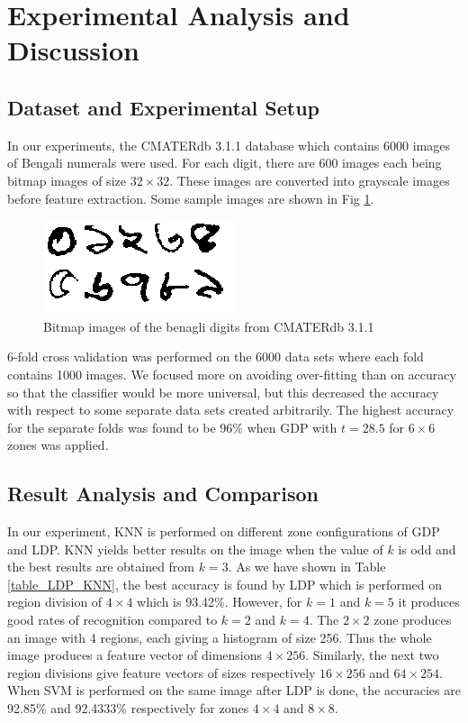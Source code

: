 \documentclass[conference]{IEEEtran}
\begin{document}
\section{Experimental Analysis and Discussion}

\subsection{Dataset and Experimental Setup}
In our experiments, the CMATERdb 3.1.1 \cite{2009cmater} database which contains 6000 images of Bengali numerals were used. For each digit, there are 600 images each being bitmap images of size $32 \times 32$. These images are converted into grayscale images before feature extraction. Some sample images are shown in Fig \ref{fig:bangladigits}.

\begin{figure}
	\includegraphics[width=\linewidth]{digits.png}
	\caption{Bitmap images of the benagli digits from CMATERdb 3.1.1}
	\label{fig:bangladigits}
\end{figure}

6-fold cross validation was performed on the 6000 data sets where each fold contains 1000 images. We focused more on avoiding over-fitting than on accuracy so that the classifier would be more universal, but this decreased the accuracy with respect to some separate data sets created arbitrarily. The highest accuracy for the separate folds was found to be 96\% when GDP with $t = 28.5$ for $6\times6$ zones was applied.

\subsection{Result Analysis and Comparison}
In our experiment, KNN is performed on different zone configurations of GDP and LDP. KNN yields better results on the image when the value of $k$ is odd and the best results are obtained from $k = 3$. As we have shown in Table \ref{table_LDP_KNN}, the best accuracy is found by LDP which is performed on region division of $4 \times 4$ which is 93.42\%. However, for $k = 1$ and $k = 5$ it produces good rates of recognition compared to $k = 2$ and $k = 4$. The $2\times2$ zone produces an image with 4 regions, each giving a histogram of size 256. Thus the whole image produces a feature vector of dimensions $4\times256$. Similarly, the next two region divisions give feature vectors of sizes respectively $16\times256$ and $64\times254$. When SVM is performed on the same image after LDP is done, the accuracies are 92.85\% and 92.4333\% respectively for zones $4\times4$ and $8\times8$. 
\end{document}
